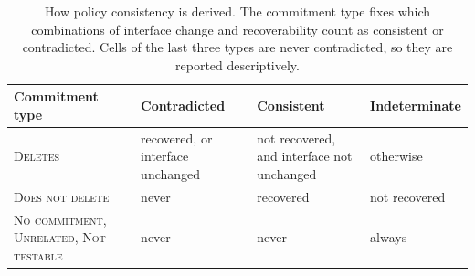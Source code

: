 \documentclass[conference,compsoc]{IEEEtran}
\begin{document}
\begin{table}[t]
\centering
\caption{How policy consistency is derived. The commitment type fixes
which combinations of interface change and recoverability count as
consistent or contradicted. Cells of the last three types are never
contradicted, so they are reported descriptively.}
\label{tab:consistency-rule}
\small
\setlength{\tabcolsep}{3.5pt}
\begin{tabular}{@{}p{}p{}p{}p{}@{}}
\toprule
Commitment type & Contradicted & Consistent & Indeterminate \\
\midrule
\textsc{Deletes} & recovered, or interface unchanged
 & not recovered, and interface not unchanged & otherwise \\
\textsc{Does not delete} & never & recovered & not recovered \\
\textsc{No commitment}, \textsc{Unrelated}, \textsc{Not testable}
 & never & never & always \\
\bottomrule
\end{tabular}
\end{table}
\end{document}
